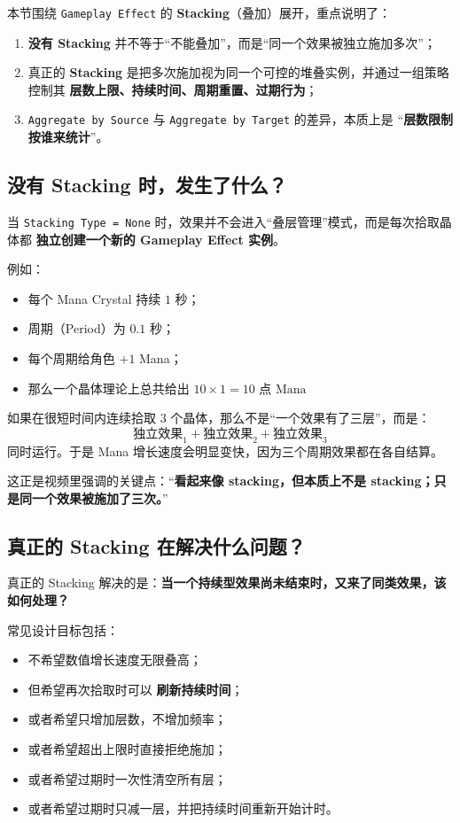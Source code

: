 本节围绕 \texttt{Gameplay Effect} 的 \textbf{Stacking}（叠加）展开，重点说明了：
\begin{enumerate}
	\item \textbf{没有 Stacking} 并不等于“不能叠加”，而是“同一个效果被独立施加多次”；
	\item 真正的 \textbf{Stacking} 是把多次施加视为同一个可控的堆叠实例，并通过一组策略控制其
	\textbf{层数上限、持续时间、周期重置、过期行为}；
	\item \texttt{Aggregate by Source} 与 \texttt{Aggregate by Target} 的差异，本质上是
	``\textbf{层数限制按谁来统计}''。
\end{enumerate}

\subsection{没有 Stacking 时，发生了什么？}

当 \texttt{Stacking Type = None} 时，效果并不会进入“叠层管理”模式，而是每次拾取晶体都
\textbf{独立创建一个新的 Gameplay Effect 实例}。

例如：
\begin{itemize}
	\item 每个 Mana Crystal 持续 $1$ 秒；
	\item 周期（Period）为 $0.1$ 秒；
	\item 每个周期给角色 $+1$ Mana；
	\item 那么一个晶体理论上总共给出 $	10 \times 1 = 10 \text{ 点 Mana}	$
\end{itemize}

如果在很短时间内连续拾取 $3$ 个晶体，那么不是“一个效果有了三层”，而是：
\[
\text{独立效果}_1 + \text{独立效果}_2 + \text{独立效果}_3
\]
同时运行。于是 Mana 增长速度会明显变快，因为三个周期效果都在各自结算。

这正是视频里强调的关键点：“\textbf{看起来像 stacking，但本质上不是 stacking；只是同一个效果被施加了三次。}”

\subsection{真正的 Stacking 在解决什么问题？}

真正的 Stacking 解决的是：\textbf{当一个持续型效果尚未结束时，又来了同类效果，该如何处理？}

常见设计目标包括：
\begin{itemize}
	\item 不希望数值增长速度无限叠高；
	\item 但希望再次拾取时可以 \textbf{刷新持续时间}；
	\item 或者希望只增加层数，不增加频率；
	\item 或者希望超出上限时直接拒绝施加；
	\item 或者希望过期时一次性清空所有层；
	\item 或者希望过期时只减一层，并把持续时间重新开始计时。
\end{itemize}

